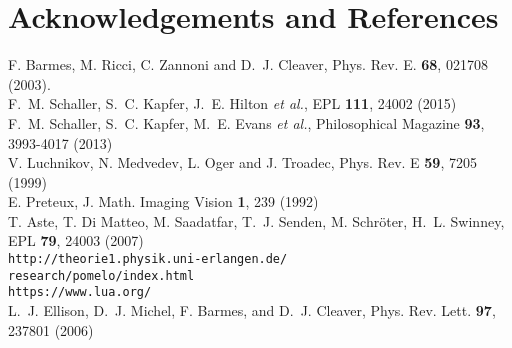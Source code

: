 \documentclass[epj,twocolumn]{webofc}
\begin{document}
\section*{Acknowledgements and References}
%
% 
%
%
\begin{thebibliography}{}
%
%
F. Barmes, M. Ricci, C. Zannoni and D.~J. Cleaver, Phys. Rev. E. \textbf{68}, 021708 (2003).\\

    F.~M. Schaller, S.~C. Kapfer, J.~E. Hilton \textit{et al.}, EPL \textbf{111}, 24002 (2015)\\

    F.~M. Schaller, S.~C. Kapfer, M.~E. Evans \textit{et al.}, Philosophical Magazine \textbf{93}, 3993-4017 (2013)\\

    V. Luchnikov, N. Medvedev, L. Oger and J. Troadec, Phys. Rev. E \textbf{59}, 7205 (1999)\\

    E. Preteux, J. Math. Imaging Vision \textbf{1}, 239 (1992)\\

T. Aste, T. Di Matteo, M. Saadatfar, T.~J. Senden, M. Schröter, H.~L. Swinney, EPL \textbf{79}, 24003 (2007)\\

\verb~http://theorie1.physik.uni-erlangen.de/~\\\verb~research/pomelo/index.html~\\

\verb~https://www.lua.org/~\\

L.~J. Ellison, D.~J. Michel, F. Barmes, and D.~J. Cleaver, Phys. Rev. Lett. \textbf{97}, 237801 (2006)\\
\end{thebibliography}
\end{document}
